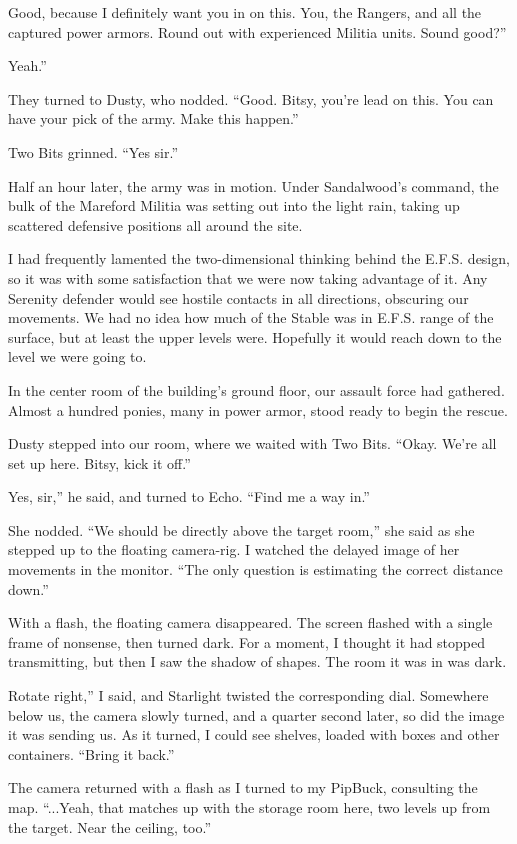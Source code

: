 \leavevmode{}Good, because I definitely want you in on this. You, the Rangers, and all the captured power armors. Round out with experienced Militia units. Sound good?”

\leavevmode{}Yeah.”

They turned to Dusty, who nodded. “Good. Bitsy, you’re lead on this. You can have your pick of the army. Make this happen.”

Two Bits grinned. “Yes sir.”

{\br}%
Half an hour later, the army was in motion. Under Sandalwood’s command, the bulk of the Mareford Militia was setting out into the light rain, taking up scattered defensive positions all around the site.

I had frequently lamented the two-dimensional thinking behind the E.F.S. design, so it was with some satisfaction that we were now taking advantage of it. Any Serenity defender would see hostile contacts in all directions, obscuring our movements. We had no idea how much of the Stable was in E.F.S. range of the surface, but at least the upper levels were. Hopefully it would reach down to the level we were going to.

In the center room of the building’s ground floor, our assault force had gathered. Almost a hundred ponies, many in power armor, stood ready to begin the rescue.

Dusty stepped into our room, where we waited with Two Bits. “Okay. We’re all set up here. Bitsy, kick it off.”

\leavevmode{}Yes, sir,” he said, and turned to Echo. “Find me a way in.”

She nodded. “We should be directly above the target room,” she said as she stepped up to the floating camera-rig. I watched the delayed image of her movements in the monitor. “The only question is estimating the correct distance down.”

With a flash, the floating camera disappeared. The screen flashed with a single frame of nonsense, then turned dark. For a moment, I thought it had stopped transmitting, but then I saw the shadow of shapes. The room it was in was dark.

\leavevmode{}Rotate right,” I said, and Starlight twisted the corresponding dial. Somewhere below us, the camera slowly turned, and a quarter second later, so did the image it was sending us. As it turned, I could see shelves, loaded with boxes and other containers. “Bring it back.”

The camera returned with a flash as I turned to my PipBuck, consulting the map. “...Yeah, that matches up with the storage room here, two levels up from the target. Near the ceiling, too.”

